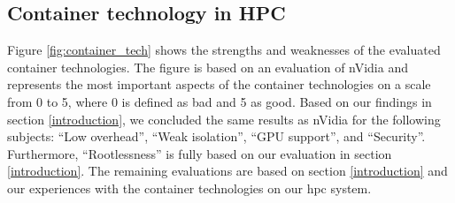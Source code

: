 \documentclass[12pt]{article}
\begin{document}



\subsection{Container technology in HPC}
    Figure \ref{fig:container_tech} shows the strengths and weaknesses of the evaluated container technologies. The figure is based on an evaluation of nVidia \cite{nvidia-slurm-containers} and represents the most important aspects of the container technologies on a scale from 0 to 5, where 0 is defined as bad and 5 as good. Based on our findings in section \ref{introduction}, we concluded the same results as nVidia for the following subjects: ``Low overhead'', ``Weak isolation'', ``GPU support'', and ``Security''. Furthermore, ``Rootlessness'' is fully based on our evaluation in section \ref{introduction}. The remaining evaluations are based on section \ref{introduction} and our experiences with the container technologies on our \gls{hpc} system.
    
    
    
    
\end{document}
